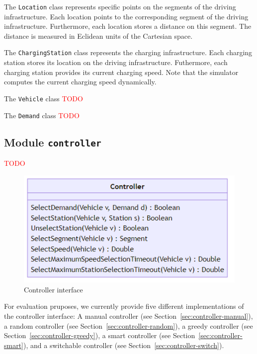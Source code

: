 \documentclass[10pt,twocolumn]{article}
\begin{document}
The \texttt{Location} class represents specific points on the segments of the driving infrastructure.
Each location points to the corresponding segment of the driving infrastructure.
Furthermore, each location stores a distance on this segment.
The distance is measured in Eclidean units of the Cartesian space.

The \texttt{ChargingStation} class represents the charging infrastructure.
Each charging station stores its location on the driving infrastructure.
Futhermore, each charging station provides its current charging speed.
Note that the simulator computes the current charging speed dynamically.

The \texttt{Vehicle} class \textcolor{red}{TODO}

The \texttt{Demand} class \textcolor{red}{TODO}

\subsection{Module \texttt{controller}}
\label{sec:controller-interface}


\textcolor{red}{TODO}

\begin{figure}[h!]
    \centering
    \includegraphics[scale=0.4]{../../diagrams/controller/classes-minimal.png}
    \caption{Controller interface}
    \label{fig:controller-interface}
\end{figure}

For evaluation pruposes, we currently provide five different implementations of the controller interface:
A manual controller (see Section~\ref{sec:controller-manual}), a random controller (see Section~\ref{sec:controller-random}), a greedy controller (see Section~\ref{sec:controller-greedy}), a smart controller (see Section~\ref{sec:controller-smart}), and a switchable controller (see Section~\ref{sec:controller-switch}).
\end{document}
